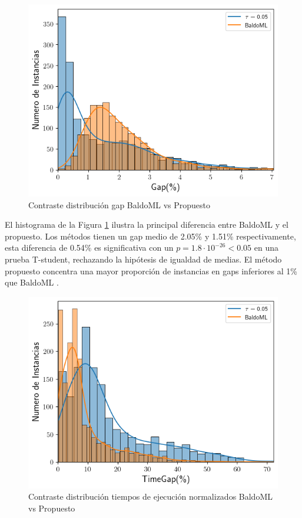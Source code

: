 \documentclass[spanish, a4paper, 12pt, openany,final]{book}
\begin{document}
\begin{figure}[H]
	\centering
	\includegraphics[scale=0.7]{graphs/distributions.png}
	\caption{Contraste distribución gap BaldoML vs Propuesto}\label{fig:distributions}
\end{figure}

El histograma de la Figura \ref{fig:distributions} ilustra la principal diferencia entre BaldoML y el propuesto. Los métodos tienen un gap medio de 2.05\% y 1.51\% respectivamente, esta diferencia de 0.54\% es significativa con un $p = 1.8\cdot10^{-26} < 0.05$ en una prueba T-student, rechazando la hipótesis de igualdad de medias. El método propuesto concentra una mayor proporción de instancias en gaps inferiores al 1\% que BaldoML .

\begin{figure}[H]
	\centering
	\includegraphics[scale=0.7]{graphs/distributions_times.png}	
	\caption{Contraste distribución tiempos de ejecución normalizados BaldoML vs Propuesto}\label{fig:distributions_times}
\end{figure}
\end{document}
